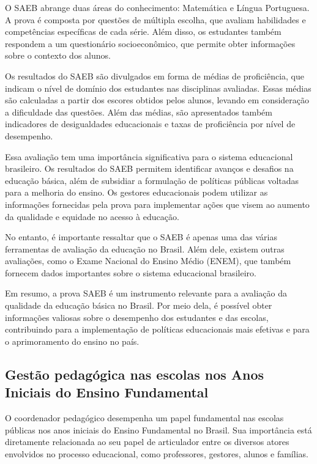 O SAEB abrange duas áreas do conhecimento: Matemática e Língua
Portuguesa. A prova é composta por questões de múltipla escolha, que
avaliam habilidades e competências específicas de cada série. Além
disso, os estudantes também respondem a um questionário socioeconômico,
que permite obter informações sobre o contexto dos alunos.

Os resultados do SAEB são divulgados em forma de médias de proficiência,
que indicam o nível de domínio dos estudantes nas disciplinas avaliadas.
Essas médias são calculadas a partir dos escores obtidos pelos alunos,
levando em consideração a dificuldade das questões. Além das médias, são
apresentados também indicadores de desigualdades educacionais e taxas de
proficiência por nível de desempenho.

Essa avaliação tem uma importância significativa para o sistema
educacional brasileiro. Os resultados do SAEB permitem identificar
avanços e desafios na educação básica, além de subsidiar a formulação de
políticas públicas voltadas para a melhoria do ensino. Os gestores
educacionais podem utilizar as informações fornecidas pela prova para
implementar ações que visem ao aumento da qualidade e equidade no acesso
à educação.

No entanto, é importante ressaltar que o SAEB é apenas uma das várias
ferramentas de avaliação da educação no Brasil. Além dele, existem
outras avaliações, como o Exame Nacional do Ensino Médio (ENEM), que
também fornecem dados importantes sobre o sistema educacional
brasileiro.

Em resumo, a prova SAEB é um instrumento relevante para a avaliação da
qualidade da educação básica no Brasil. Por meio dela, é possível obter
informações valiosas sobre o desempenho dos estudantes e das escolas,
contribuindo para a implementação de políticas educacionais mais
efetivas e para o aprimoramento do ensino no país.

\subsection{Gestão pedagógica nas escolas nos Anos Iniciais do Ensino
Fundamental}\label{gestuxe3o-pedaguxf3gica-nas-escolas-nos-anos-iniciais-do-ensino-fundamental}

O coordenador pedagógico desempenha um papel fundamental nas escolas
públicas nos anos iniciais do Ensino Fundamental no Brasil. Sua
importância está diretamente relacionada ao seu papel de articulador
entre os diversos atores envolvidos no processo educacional, como
professores, gestores, alunos e famílias.

